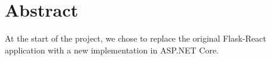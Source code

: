 \documentclass[12pt,a4paper,reqno]{report}
\begin{document}
     
    \clearpage
    \tableofcontents

    \setcounter{page}{0}
    \clearpage 

    \section{Abstract}
    At the start of the project, we chose to replace the original Flask-React application with a new implementation in ASP.NET Core.
    \printbibliography[heading=none]
\end{document}
